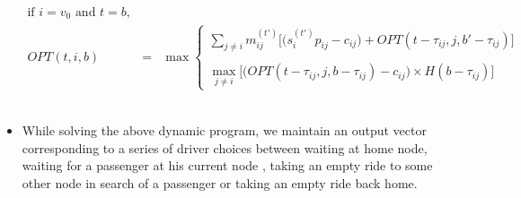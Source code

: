\begin{itemize}
\begin{eqnarray*}
        \text{if }i=v_0 \text{ and } t=b, \\ 
        OPT(t, i, b) &=& \max
        \begin{cases}
        \sum\limits_{j\neq i}m_{ij}^{(t')}\bigg[\Big(s_{i}^{(t')} p_{ij} - c_{ij}\Big) + OPT(t-\tau_{ij},j, b'-\tau_{ij})\bigg] \\ \\
        \max\limits_{j\neq i}\Big[\Big(OPT(t-\tau_{ij},j, b - \tau_{ij}) - c_{ij}\Big)\times H(b - \tau_{ij})\Big]
        \end{cases} \\ \\ \\
        \end{eqnarray*}
        
\item While solving the above dynamic program, we maintain an output vector corresponding to a series of driver choices between waiting at home node, waiting for a passenger at his current node , taking an empty ride to some other node in search of a passenger or taking an empty ride back home.
\end{itemize}